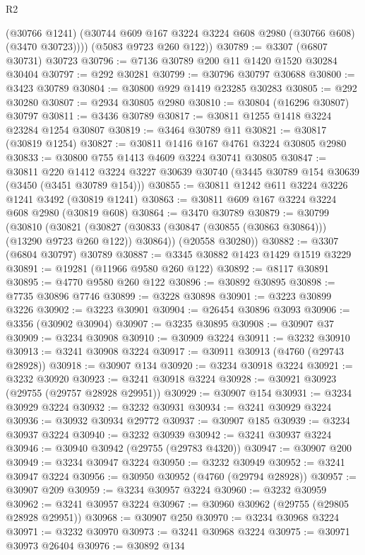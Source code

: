 \begin{lexlean}{R2}
\begin{coremodule}
          (@30766 @1241)
          (@30744 @609 @167 @3224 @3224 @608 @2980 (@30766 @608) (@3470 @30723))))
      (@5083 @9723 @260 @122))
@30789 := @3307 (@6807 @30731) @30723
@30796 := @7136 @30789 @200 @11 @1420 @1520 @30284 @30404
@30797 := @292 @30281
@30799 := @30796 @30797 @30688
@30800 := @3423 @30789
@30804 := @30800 @929 @1419 @23285 @30283
@30805 := @292 @30280
@30807 := @2934 @30805 @2980
@30810 := @30804 (@16296 @30807) @30797
@30811 := @3436 @30789
@30817 := @30811 @1255 @1418 @3224 @23284 @1254 @30807
@30819 := @3464 @30789 @11
@30821 := @30817 (@30819 @1254)
@30827 := @30811 @1416 @167 @4761 @3224 @30805 @2980
@30833 := @30800 @755 @1413 @4609 @3224 @30741 @30805
@30847 := @30811
    @220
    @1412
    @3224
    @3227
    @30639
    @30740
    (@3445 @30789 @154 @30639 (@3450 (@3451 @30789 @154)))
@30855 := @30811 @1242 @611 @3224 @3226 @1241 @3492 (@30819 @1241)
@30863 := @30811 @609 @167 @3224 @3224 @608 @2980 (@30819 @608)
@30864 := @3470 @30789
@30879 := @30799
    (@30810
      (@30821 (@30827 (@30833 (@30847 (@30855 (@30863 @30864))) (@13290 @9723 @260 @122)) @30864))
      (@20558 @30280))
@30882 := @3307 (@6804 @30797) @30789
@30887 := @3345 @30882 @1423 @1429 @1519 @3229
@30891 := @19281 (@11966 @9580 @260 @122)
@30892 := @8117 @30891
@30895 := @4770 @9580 @260 @122
@30896 := @30892 @30895
@30898 := @7735 @30896 @7746
@30899 := @3228 @30898
@30901 := @3223 @30899 @3226
@30902 := @3223 @30901
@30904 := @26454 @30896 @3093
@30906 := @3356 (@30902 @30904)
@30907 := @3235 @30895
@30908 := @30907 @37
@30909 := @3234 @30908
@30910 := @30909 @3224
@30911 := @3232 @30910
@30913 := @3241 @30908 @3224
@30917 := @30911 @30913 (@4760 (@29743 @28928))
@30918 := @30907 @134
@30920 := @3234 @30918 @3224
@30921 := @3232 @30920
@30923 := @3241 @30918 @3224
@30928 := @30921 @30923 (@29755 (@29757 @28928 @29951))
@30929 := @30907 @154
@30931 := @3234 @30929 @3224
@30932 := @3232 @30931
@30934 := @3241 @30929 @3224
@30936 := @30932 @30934 @29772
@30937 := @30907 @185
@30939 := @3234 @30937 @3224
@30940 := @3232 @30939
@30942 := @3241 @30937 @3224
@30946 := @30940 @30942 (@29755 (@29783 @4320))
@30947 := @30907 @200
@30949 := @3234 @30947 @3224
@30950 := @3232 @30949
@30952 := @3241 @30947 @3224
@30956 := @30950 @30952 (@4760 (@29794 @28928))
@30957 := @30907 @209
@30959 := @3234 @30957 @3224
@30960 := @3232 @30959
@30962 := @3241 @30957 @3224
@30967 := @30960 @30962 (@29755 (@29805 @28928 @29951))
@30968 := @30907 @250
@30970 := @3234 @30968 @3224
@30971 := @3232 @30970
@30973 := @3241 @30968 @3224
@30975 := @30971 @30973 @26404
@30976 := @30892 @134

\end{coremodule}
\end{lexlean}
